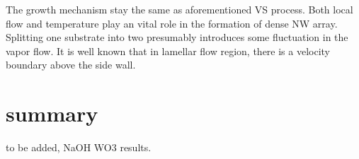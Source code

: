 The growth mechanism stay the same as aforementioned VS process. Both local flow and temperature play an vital role in the formation of dense NW array. Splitting one substrate into two presumably introduces some fluctuation in the vapor flow. It is well known that in lamellar flow region, there is a velocity boundary above the side wall.

\section{summary}

to be added, NaOH WO3 results. 


